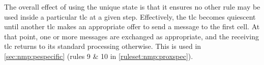 The overall effect of using the unique state is that it ensures no other rule may be used inside a particular \gls{tlc} at a given step.  Effectively, the \gls{tlc} becomes quiescent until another \gls{tlc} makes an appropriate offer to send a message to the first cell.  At that point, one or more messages are exchanged as appropriate, and the receiving \gls{tlc} returns to its standard processing otherwise.  This is used in \cref{sec:nmp:pespecific} (rules 9 \& 10 in \vref{ruleset:nmp:proxspec}).

